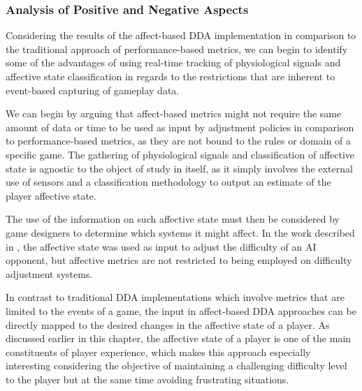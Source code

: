 \subsubsection{Analysis of Positive and Negative Aspects}

Considering the results of the affect-based DDA implementation in comparison to the traditional approach of performance-based metrics, we can begin to identify some of the advantages of using real-time tracking of physiological signals and affective state classification in regards to the restrictions that are inherent to event-based capturing of gameplay data.

We can begin by arguing that affect-based metrics might not require the same amount of data or time to be used as input by adjustment policies in comparison to performance-based metrics, as they are not bound to the rules or domain of a specific game. The gathering of physiological signals and classification of affective state is agnostic to the object of study in itself, as it simply involves the external use of sensors and a classification methodology to output an estimate of the player affective state.

The use of the information on such affective state must then be considered by game designers to determine which systems it might affect. In the work described in \cite{article_affectivedda}, the affective state was used as input to adjust the difficulty of an AI opponent, but affective metrics are not restricted to being employed on difficulty adjustment systems.

 In contrast to traditional DDA implementations which involve metrics that are limited to the events of a game, the input in affect-based DDA approaches can be directly mapped to the desired changes in the affective state of a player. As discussed earlier in this chapter, the affective state of a player is one of the main constituents of player experience, which makes this approach especially interesting considering the objective of maintaining a challenging difficulty level to the player but at the same time avoiding frustrating situations.  

